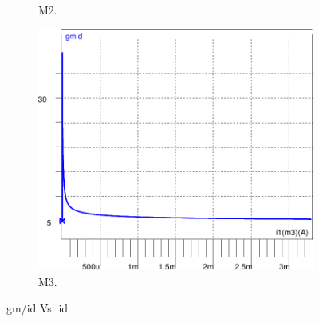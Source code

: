 \begin{figure}[!tbp]
\begin{subfigure}[b]{0.3\textwidth}
   \caption{M2.}
   \end{subfigure}
 \begin{subfigure}[b]{0.3\textwidth}
   \includegraphics[width=\textwidth]{images/gmid_id_m3}
   \caption{M3.}
   \label{fig:f2}
   \end{subfigure}
    \caption{gm/id Vs. id}
\end{figure}






